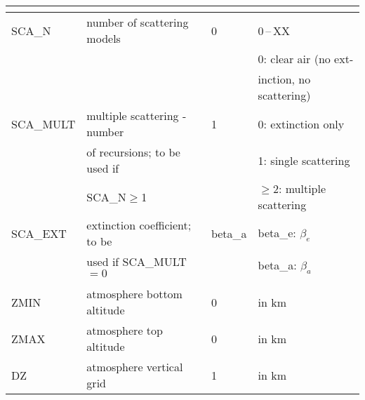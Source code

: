 \begin{table*}[!h]
\begin{tabular}{|l|l|l|l|}
\multicolumn{4}{|l|}{\cellcolor[RGB]{255,204,230}{Aerosol and Clouds}} \\
\hline
SCA\_N       & number of scattering models   & 0     & 0\,--\,XX \\
             &                               &       & 0: clear air (no ext- \\
             &                               &       & inction, no scattering) \\
SCA\_MULT    & multiple scattering - number  & 1     & 0: extinction only\\
             & of recursions; to be used if  &       & 1: single scattering \\
             & SCA\_N$\ge$1                  &       & $\ge$2: multiple scattering \\
SCA\_EXT     & extinction coefficient; to be &beta\_a& beta\_e: $\beta_e$  \\
             & used if SCA\_MULT$=0$         &       & beta\_a: $\beta_a$  \\
\hline
\hline

\multicolumn{4}{|l|}{\cellcolor[RGB]{255,204,230}{Atmosphere/Climatology}} \\
\hline
ZMIN           & atmosphere bottom altitude  & 0  & in km \\ 
ZMAX           & atmosphere top altitude     & 0  & in km \\
DZ             & atmosphere vertical grid     & 1  & in km \\
\hline
\end{tabular}
\label{tab:Control1}
\end{table*} 

